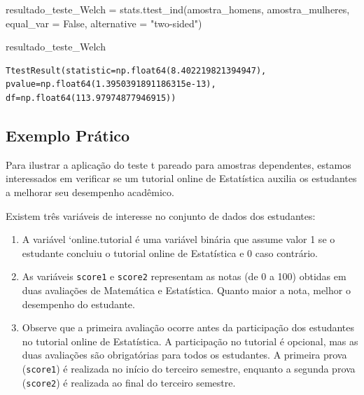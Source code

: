 \documentclass[
  letterpaper,
  DIV=11,
  numbers=noendperiod]{scrreprt}
\newenvironment{Shaded}{\begin{snugshade}}{\end{snugshade}}
\newcommand{\NormalTok}[1]{\textcolor[rgb]{0.00,0.23,0.31}{#1}}
\newcommand{\OperatorTok}[1]{\textcolor[rgb]{0.37,0.37,0.37}{#1}}
\newcommand{\StringTok}[1]{\textcolor[rgb]{0.13,0.47,0.30}{#1}}
\newcommand{\VariableTok}[1]{\textcolor[rgb]{0.07,0.07,0.07}{#1}}
\begin{document}
\begin{Shaded}
\begin{Highlighting}[]
\NormalTok{resultado\_teste\_Welch }\OperatorTok{=}\NormalTok{ stats.ttest\_ind(amostra\_homens, amostra\_mulheres, }
\NormalTok{                              equal\_var }\OperatorTok{=} \VariableTok{False}\NormalTok{, }
\NormalTok{                              alternative }\OperatorTok{=} \StringTok{"two{-}sided"}\NormalTok{)}

\NormalTok{resultado\_teste\_Welch}
\end{Highlighting}
\end{Shaded}

\begin{verbatim}
TtestResult(statistic=np.float64(8.402219821394947), pvalue=np.float64(1.3950391891186315e-13), df=np.float64(113.97974877946915))
\end{verbatim}

\subsection{Exemplo Prático}\label{exemplo-pruxe1tico-1}

Para ilustrar a aplicação do teste t pareado para amostras dependentes,
estamos interessados em verificar se um tutorial online de Estatística
auxilia os estudantes a melhorar seu desempenho acadêmico.

Existem três variáveis de interesse no conjunto de dados dos estudantes:

\begin{enumerate}
\def\labelenumi{\arabic{enumi}.}
\item
  A variável `online.tutorial é uma variável binária que assume valor 1
  se o estudante concluiu o tutorial online de Estatística e 0 caso
  contrário.
\item
  As variáveis \texttt{score1} e \texttt{score2} representam as notas
  (de 0 a 100) obtidas em duas avaliações de Matemática e Estatística.
  Quanto maior a nota, melhor o desempenho do estudante.
\item
  Observe que a primeira avaliação ocorre antes da participação dos
  estudantes no tutorial online de Estatística. A participação no
  tutorial é opcional, mas as duas avaliações são obrigatórias para
  todos os estudantes. A primeira prova (\texttt{score1}) é realizada no
  início do terceiro semestre, enquanto a segunda prova
  (\texttt{score2}) é realizada ao final do terceiro semestre.
\end{enumerate}
\end{document}
